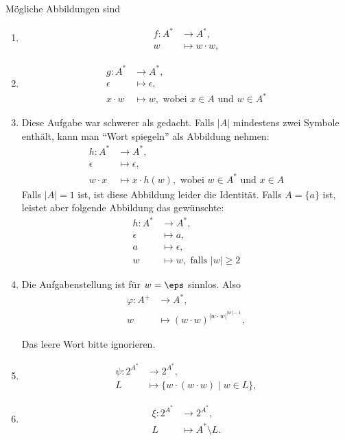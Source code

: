 \documentclass[12pt]{article}
\begin{document}
\begin{loesung}
  Mögliche Abbildungen sind
  \begin{enumerate}
  \item 
    \begin{align*}
      f \colon A^* &\to     A^*,\\
      w &\mapsto w \cdot w,
    \end{align*}
  \item 
    \begin{align*}
      g \colon A^* &\to     A^*,\\
      \epsilon &\mapsto \epsilon,\\
      x \cdot w &\mapsto w, \text{ wobei $x \in A$ und $w \in A^*$}
    \end{align*}
  \item Diese Aufgabe war schwerer als gedacht. Falls $|A|$
    mindestens zwei Symbole enthält, kann man \zB "`Wort spiegeln"'
    als Abbildung nehmen:
    \begin{align*}
      h \colon A^* &\to     A^*,\\
      \epsilon &\mapsto \epsilon,\\
      w \cdot x &\mapsto x \cdot h(w), \text{ wobei $w \in A^*$ und $x \in A$}
    \end{align*}
    Falls $|A|=1$
    ist, ist diese Abbildung leider die Identität. Falls $A=\{a\}$
    ist, leistet aber \zB folgende Abbildung das gewünschte:
    \begin{align*}
      h \colon A^* &\to     A^*,\\
      \epsilon &\mapsto a,\\
      a &\mapsto \epsilon,\\
      w  &\mapsto w, \text{ falls } |w|\geq 2
    \end{align*}
  \item Die Aufgabenstellung ist für $w=\eps$ sinnlos. Also
    \begin{align*}
      \varphi \colon A^+ &\to     A^*,\\
      w &\mapsto (w \cdot w)^{|w \cdot w|^{|w| - 1}},
    \end{align*}
    \begin{korrektur}
      Das leere Wort bitte ignorieren.
    \end{korrektur}
  \item
    \begin{align*}
      \psi \colon 2^{A^*} &\to     2^{A^*},\\
      L &\mapsto \{ w \cdot (w \cdot w) \mid w \in L \},
    \end{align*}
  \item
    \begin{align*}
      \xi \colon 2^{A^*} &\to     2^{A^*},\\
      L &\mapsto A^* \setminus L.
    \end{align*}
  \end{enumerate}
\end{loesung}
\end{document}
